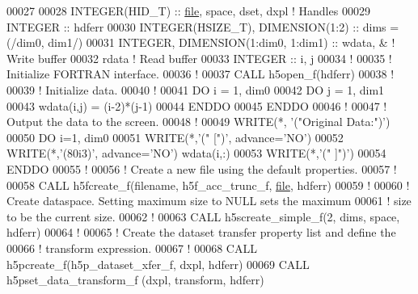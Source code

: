 \begin{DoxyCode}
00027 
00028   \textcolor{keywordtype}{INTEGER(HID\_T)}  :: \hyperlink{structfile}{file}, space, dset, dxpl \textcolor{comment}{! Handles}
00029   \textcolor{keywordtype}{INTEGER}         :: hdferr
00030   \textcolor{keywordtype}{INTEGER(HSIZE\_T)}, \textcolor{keywordtype}{DIMENSION(1:2)} :: dims = (/dim0, dim1/)
00031   \textcolor{keywordtype}{INTEGER}, \textcolor{keywordtype}{DIMENSION(1:dim0, 1:dim1)} :: wdata, & \textcolor{comment}{! Write buffer }
00032                                         rdata    \textcolor{comment}{! Read buffer}
00033   \textcolor{keywordtype}{INTEGER} :: i, j
00034   \textcolor{comment}{!}
00035   \textcolor{comment}{! Initialize FORTRAN interface.}
00036   \textcolor{comment}{!}
00037   \textcolor{keyword}{CALL }h5open\_f(hdferr)
00038   \textcolor{comment}{!}
00039   \textcolor{comment}{! Initialize data.}
00040   \textcolor{comment}{!}
00041   \textcolor{keywordflow}{DO} i = 1, dim0
00042      \textcolor{keywordflow}{DO} j = 1, dim1
00043         wdata(i,j) = (i-2)*(j-1)
00044 \textcolor{keywordflow}{     ENDDO}
00045 \textcolor{keywordflow}{  ENDDO}
00046   \textcolor{comment}{!}
00047   \textcolor{comment}{! Output the data to the screen.}
00048   \textcolor{comment}{!}
00049   \textcolor{keyword}{WRITE}(*, \textcolor{stringliteral}{'("Original Data:")'})
00050   \textcolor{keywordflow}{DO} i=1, dim0
00051      \textcolor{keyword}{WRITE}(*,\textcolor{stringliteral}{'(" [")'}, advance=\textcolor{stringliteral}{'NO'})
00052      \textcolor{keyword}{WRITE}(*,\textcolor{stringliteral}{'(80i3)'}, advance=\textcolor{stringliteral}{'NO'}) wdata(i,:)
00053      \textcolor{keyword}{WRITE}(*,\textcolor{stringliteral}{'(" ]")'})
00054 \textcolor{keywordflow}{  ENDDO}
00055   \textcolor{comment}{!}
00056   \textcolor{comment}{! Create a new file using the default properties.}
00057   \textcolor{comment}{!}
00058   \textcolor{keyword}{CALL }h5fcreate\_f(filename, h5f\_acc\_trunc\_f, \hyperlink{structfile}{file}, hdferr)
00059   \textcolor{comment}{!}
00060   \textcolor{comment}{! Create dataspace.  Setting maximum size to NULL sets the maximum}
00061   \textcolor{comment}{! size to be the current size.}
00062   \textcolor{comment}{!}
00063   \textcolor{keyword}{CALL }h5screate\_simple\_f(2, dims, space, hdferr)
00064   \textcolor{comment}{!}
00065   \textcolor{comment}{! Create the dataset transfer property list and define the}
00066   \textcolor{comment}{! transform expression.}
00067   \textcolor{comment}{!}
00068   \textcolor{keyword}{CALL }h5pcreate\_f(h5p\_dataset\_xfer\_f, dxpl, hdferr)
00069   \textcolor{keyword}{CALL }h5pset\_data\_transform\_f (dxpl, transform, hdferr)

\end{DoxyCode}
